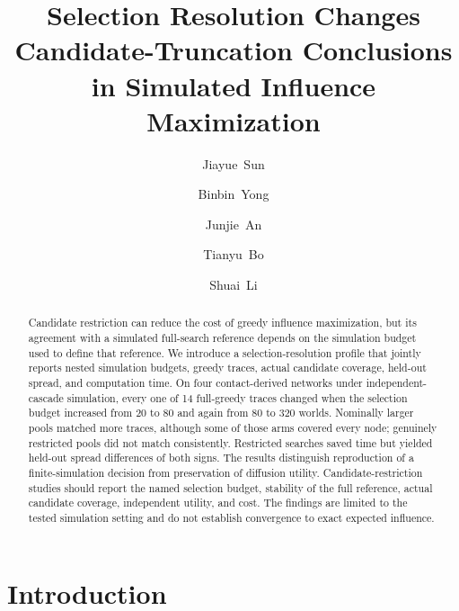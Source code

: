 \documentclass[smallextended]{svjour3}
\begin{document}
\title{Selection Resolution Changes Candidate-Truncation Conclusions in Simulated Influence Maximization}
\author{\mbox{Jiayue Sun} \and \mbox{Binbin Yong} \and \mbox{Junjie An} \and \mbox{Tianyu Bo} \and \mbox{Shuai Li}}
\date{}
\maketitle
\begin{abstract}
Candidate restriction can reduce the cost of greedy influence maximization, but its agreement with a simulated full-search reference depends on the simulation budget used to define that reference. We introduce a selection-resolution profile that jointly reports nested simulation budgets, greedy traces, actual candidate coverage, held-out spread, and computation time. On four contact-derived networks under independent-cascade simulation, every one of 14 full-greedy traces changed when the selection budget increased from 20 to 80 and again from 80 to 320 worlds. Nominally larger pools matched more traces, although some of those arms covered every node; genuinely restricted pools did not match consistently. Restricted searches saved time but yielded held-out spread differences of both signs. The results distinguish reproduction of a finite-simulation decision from preservation of diffusion utility. Candidate-restriction studies should report the named selection budget, stability of the full reference, actual candidate coverage, independent utility, and cost. The findings are limited to the tested simulation setting and do not establish convergence to exact expected influence.
\end{abstract}


\FloatBarrier


\section{Introduction}
\end{document}
